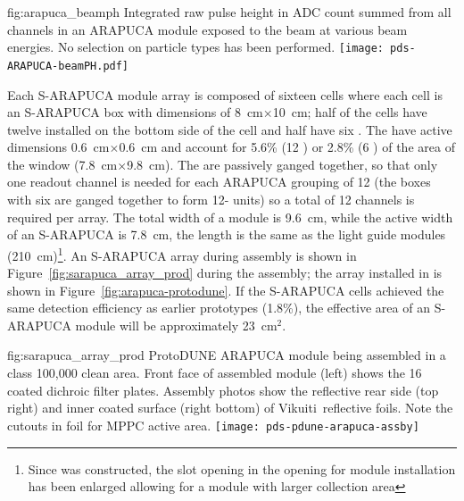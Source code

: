 \begin{dunefigure}{fig:arapuca_beamph}
{Integrated raw pulse height in ADC count summed from all channels in an ARAPUCA module exposed to the beam at various beam energies. No selection on particle types has been performed.}
	\texttt{[image: pds-ARAPUCA-beamPH.pdf]}
\end{dunefigure}

Each  S-ARAPUCA module array is composed of sixteen cells where each cell is an S-ARAPUCA box with dimensions of \SI{8}{cm}$\times$\SI{10}{cm}; half of the cells have twelve  installed on the bottom side of the cell and  half have six . The  have active dimensions \SI{0.6}{cm}$\times$\SI{0.6}{cm} and account for 5.6\% (\num{12} ) or \num{2.8}\% (\num{6} ) of the area of the window (\SI{7.8}{cm}$\times$\SI{9.8}{cm}).
The   are passively ganged together, so that only one readout channel is needed for each ARAPUCA grouping of \num{12}  (the boxes with six  are ganged together to form \num{12}- units) so a total of \num{12} channels is required per array. 
The total width of a module is \SI{9.6}{cm}, while the active width of an S-ARAPUCA is \SI{7.8}{cm}, the length is the same as the light guide modules (\SI{210}{cm})\footnote{Since  was constructed, the slot opening in the  opening for  module installation has been enlarged allowing for a module with larger collection area}.
An S-ARAPUCA array during assembly is shown in Figure~\ref{fig:sarapuca_array_prod} during the assembly; the array installed in  is shown in Figure~\ref{fig:arapuca-protodune}. If the S-ARAPUCA cells achieved the same detection efficiency as earlier prototypes (1.8\%), the effective area of an S-ARAPUCA module will be approximately \SI{23}{cm$^2$}.

\begin{dunefigure}{fig:sarapuca_array_prod}
{ProtoDUNE ARAPUCA module being assembled in a class 100,000 clean area.  Front face of assembled module (left) shows the 16 coated dichroic filter plates.  Assembly photos show the reflective rear side (top right) and inner coated surface (right bottom) of Vikuiti\texttrademark\ reflective foils.  Note the cutouts in foil for MPPC active area.}
	\texttt{[image: pds-pdune-arapuca-assby]}
\end{dunefigure}

